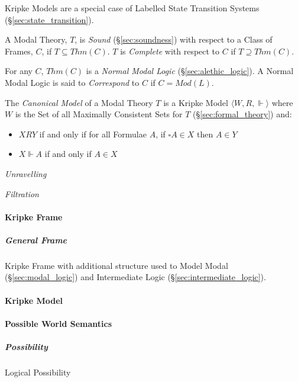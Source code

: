 Kripke Models are a special case of Labelled State Transition Systems
(\S\ref{sec:state_transition}).

A Modal Theory, $T$, is \emph{Sound} (\S\ref{sec:soundness}) with
respect to a Class of Frames, $C$, if $T \subseteq Thm(C)$. $T$ is
\emph{Complete} with respect to $C$ if $T \supseteq Thm(C)$.

For any $C$, $Thm(C)$ is a \emph{Normal Modal Logic}
(\S\ref{sec:alethic_logic}). A Normal Modal Logic is said to
\emph{Correspond} to $C$ if $C = Mod(L)$.

The \emph{Canonical Model} of a Modal Theory $T$ is a Kripke Model
$\langle W,R, \Vdash \rangle$ where $W$ is the Set of all Maximally
Consistent Sets for $T$ (\S\ref{sec:formal_theory}) and:
\begin{itemize}
\item $XRY$ if and only if for all Formulae $A$, if $\square A
  \in X$ then $A \in Y$
\item $X\Vdash A$ if and only if $A \in X$
\end{itemize}


\emph{Unravelling}

\emph{Filtration}



\paragraph{Kripke Frame}\label{sec:kripke_frame}\hfill

\subparagraph{General Frame}\label{sec:general_frame}\hfill

Kripke Frame with additional structure used to Model Modal
(\S\ref{sec:modal_logic}) and Intermediate Logic
(\S\ref{sec:intermediate_logic}).



\paragraph{Kripke Model}\label{sec:kripke_model}\hfill

\paragraph{Possible World Semantics}\label{sec:possible_world}\hfill

\subparagraph{Possibility}\label{sec:possibility}\hfill

Logical Possibility

